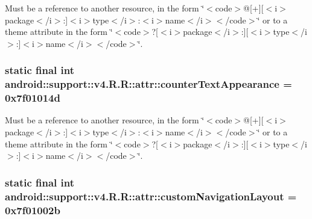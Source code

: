 Must be a reference to another resource, in the form \char`\"{}$<$code$>$@\mbox{[}+\mbox{]}\mbox{[}$<$i$>$package$<$/i$>$:\mbox{]}$<$i$>$type$<$/i$>$:$<$i$>$name$<$/i$>$$<$/code$>$\char`\"{} or to a theme attribute in the form \char`\"{}$<$code$>$?\mbox{[}$<$i$>$package$<$/i$>$:\mbox{]}\mbox{[}$<$i$>$type$<$/i$>$:\mbox{]}$<$i$>$name$<$/i$>$$<$/code$>$\char`\"{}. \hypertarget{classandroid_1_1support_1_1v4_1_1_r_1_1attr_d10dcd725ea37660b820772a2b7bb638}{
\subsubsection[{counterTextAppearance}]{\setlength{\rightskip}{0pt plus 5cm}static final int android::support::v4.R.R::attr::counterTextAppearance = 0x7f01014d}}
\label{classandroid_1_1support_1_1v4_1_1_r_1_1attr_d10dcd725ea37660b820772a2b7bb638}


Must be a reference to another resource, in the form \char`\"{}$<$code$>$@\mbox{[}+\mbox{]}\mbox{[}$<$i$>$package$<$/i$>$:\mbox{]}$<$i$>$type$<$/i$>$:$<$i$>$name$<$/i$>$$<$/code$>$\char`\"{} or to a theme attribute in the form \char`\"{}$<$code$>$?\mbox{[}$<$i$>$package$<$/i$>$:\mbox{]}\mbox{[}$<$i$>$type$<$/i$>$:\mbox{]}$<$i$>$name$<$/i$>$$<$/code$>$\char`\"{}. \hypertarget{classandroid_1_1support_1_1v4_1_1_r_1_1attr_8d3fa3e7d089a5ef838770decb6237a2}{
\subsubsection[{customNavigationLayout}]{\setlength{\rightskip}{0pt plus 5cm}static final int android::support::v4.R.R::attr::customNavigationLayout = 0x7f01002b}}
\label{classandroid_1_1support_1_1v4_1_1_r_1_1attr_8d3fa3e7d089a5ef838770decb6237a2}


